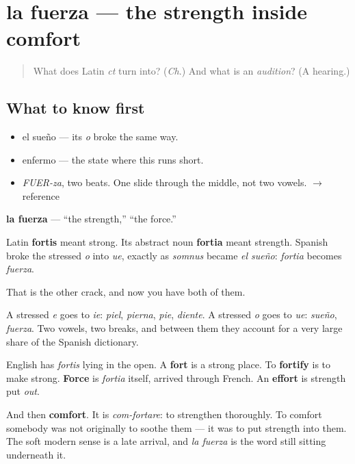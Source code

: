 \section[la fuerza]{la fuerza — the strength inside comfort}

\label{lesson:ES-C315-fuerza}



\begin{quote}
What does Latin \emph{ct} turn into? (\emph{Ch}.) And what is an \emph{audition}? (A hearing.)
\end{quote}

\subsection*{What to know first}
\begin{itemize}
\raggedright
  \item el sueño — its \emph{o} broke the same way.
  \item enfermo — the state where this runs short.
\end{itemize}

\begin{sounds}
\begin{itemize}
\raggedright
  \item \emph{FUER-za}, two beats. One slide through the middle, not two vowels. $\to$ reference
\end{itemize}
\end{sounds}

\begin{cousinweb}
\textbf{la fuerza} — \textquotedblleft{}the strength,\textquotedblright{} \textquotedblleft{}the force.\textquotedblright{}

Latin \textbf{fortis} meant strong. Its abstract noun \textbf{fortia} meant strength. Spanish broke the stressed \emph{o} into \emph{ue}, exactly as \emph{somnus} became \emph{el sueño}: \emph{fortia} becomes \emph{fuerza}.

That is the other crack, and now you have both of them.

A stressed \emph{e} goes to \emph{ie}: \emph{piel}, \emph{pierna}, \emph{pie}, \emph{diente}. A stressed \emph{o} goes to \emph{ue}: \emph{sueño}, \emph{fuerza}. Two vowels, two breaks, and between them they account for a very large share of the Spanish dictionary.

English has \emph{fortis} lying in the open. A \textbf{fort} is a strong place. To \textbf{fortify} is to make strong. \textbf{Force} is \emph{fortia} itself, arrived through French. An \textbf{effort} is strength put \emph{out}.

And then \textbf{comfort}. It is \emph{com-fortare}: to strengthen thoroughly. To comfort somebody was not originally to soothe them — it was to put strength into them. The soft modern sense is a late arrival, and \emph{la fuerza} is the word still sitting underneath it.
\end{cousinweb}

